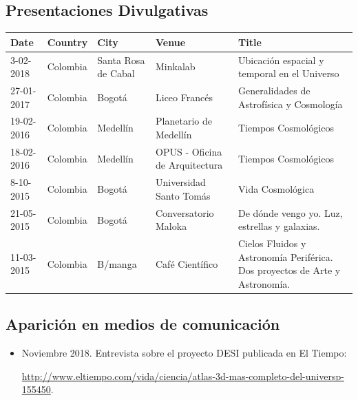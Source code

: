 \documentclass{article}
\begin{document}
\subsection{Presentaciones Divulgativas}

\begin{tabular}{p{1.7cm} p{1.2cm} p{2.0cm} p{5.0cm} p{4.5cm}}\hline
Date & Country & City& Venue& Title\\\hline

3-02-2018 & Colombia & Santa Rosa de Cabal & Minkalab & Ubicaci\'on
espacial y temporal en el Universo\\
27-01-2017 & Colombia & Bogot\'a & Liceo Franc\'es & Generalidades de Astrof\'isica y Cosmolog\'ia\\
19-02-2016 & Colombia & Medell\'in & Planetario de Medell\'in & Tiempos Cosmol\'ogicos\\
18-02-2016 & Colombia & Medell\'in & OPUS - Oficina de Arquitectura & Tiempos Cosmol\'ogicos\\
8-10-2015  & Colombia & Bogot\'a & Universidad Santo Tom\'as & Vida Cosmol\'ogica \\
21-05-2015 & Colombia & Bogot\'a & Conversatorio Maloka & De d\'onde vengo yo. Luz, estrellas y galaxias.\\
11-03-2015 & Colombia & B/manga & Caf\'e Cient\'ifico & Cielos Fluidos y Astronom\'ia Perif\'erica. Dos proyectos de Arte y Astronom\'ia.\\\hline
\end{tabular}

\subsection{Aparici\'on en medios de comunicaci\'on}

\begin{itemize}
\item Noviembre 2018. Entrevista sobre el proyecto DESI publicada en El Tiempo:

 \url{http://www.eltiempo.com/vida/ciencia/atlas-3d-mas-completo-del-universp-155450}.
\end{itemize}
\end{document}
